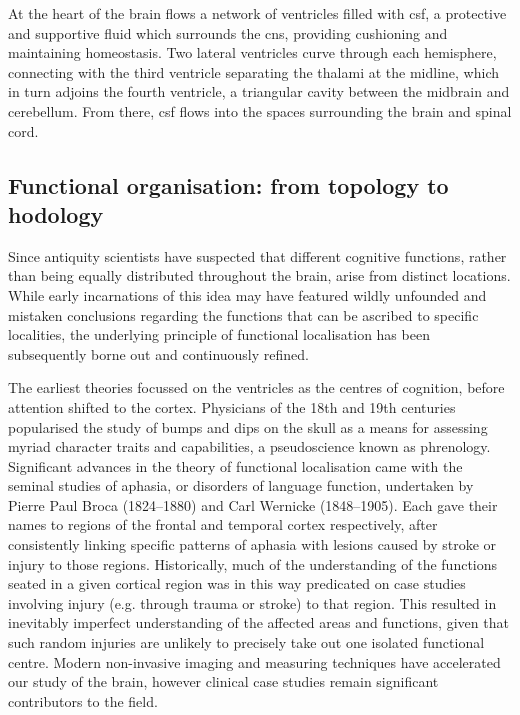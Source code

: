 At the heart of the brain flows a network of ventricles filled with \gls{csf}, a protective and supportive fluid which surrounds the \gls{cns}, providing cushioning and maintaining homeostasis.\autocite{Wichmann2022}
Two lateral ventricles curve through each hemisphere, connecting with the third ventricle separating the thalami at the midline, which in turn adjoins the fourth ventricle, a triangular cavity between the midbrain and cerebellum.
From there, \gls{csf} flows into the spaces surrounding the brain and spinal cord.

\subsection{Functional organisation: from topology to hodology}

Since antiquity scientists have suspected that different cognitive functions, rather than being equally distributed throughout the brain, arise from distinct locations.
While early incarnations of this idea may have featured wildly unfounded and mistaken conclusions regarding the functions that can be ascribed to specific localities, the underlying principle of functional localisation has been subsequently borne out and continuously refined.

The earliest theories focussed on the ventricles as the centres of cognition, before attention shifted to the cortex.\autocite{Folzenlogen2019}
Physicians of the 18th and 19th centuries popularised the study of bumps and dips on the skull as a means for assessing myriad character traits and capabilities, a pseudoscience known as phrenology.
Significant advances in the theory of functional localisation came with the seminal studies of aphasia, or disorders of language function, undertaken by Pierre Paul Broca (1824--1880) and Carl Wernicke (1848--1905).
Each gave their names to regions of the frontal and temporal cortex respectively, after consistently linking specific patterns of aphasia with lesions caused by stroke or injury to those regions.
Historically, much of the understanding of the functions seated in a given cortical region was in this way predicated on case studies involving injury (e.g. through trauma or stroke) to that region.
This resulted in inevitably imperfect understanding of the affected areas and functions, given that such random injuries are unlikely to precisely take out one isolated functional centre.
Modern non-invasive imaging and measuring techniques have accelerated our study of the brain, however clinical case studies remain significant contributors to the field.

